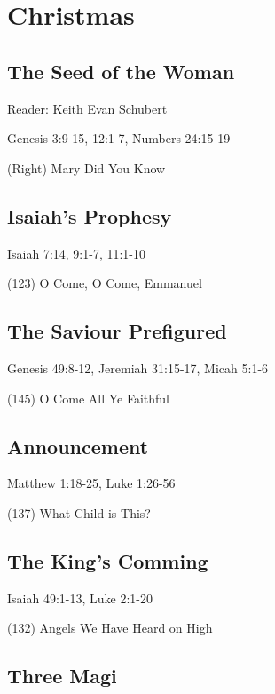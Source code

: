 \chapter{Christmas}


















\section{The Seed of the Woman}
Reader: Keith Evan Schubert

Genesis 3:9-15, 12:1-7, %
Numbers 24:15-19

(Right) Mary Did You Know


\section{Isaiah's Prophesy}

Isaiah 7:14, 9:1-7, 11:1-10

(123) O Come, O Come, Emmanuel

\section{The Saviour Prefigured}

Genesis 49:8-12, Jeremiah 31:15-17, Micah 5:1-6

(145) O Come All Ye Faithful

\section{Announcement}

Matthew 1:18-25, Luke 1:26-56

(137) What Child is This?

\section{The King's Comming}

Isaiah 49:1-13, Luke 2:1-20

(132) Angels We Have Heard on High

\section{Three Magi}

